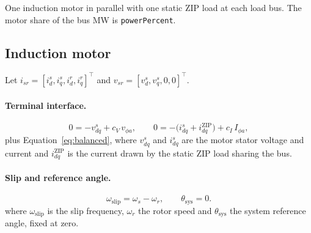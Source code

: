 \documentclass[11pt]{article}
\newcommand{\wsys}{\omega_s}
\newcommand{\wrot}{\omega_r}
\begin{document}
One induction motor in parallel with one static ZIP load at each load bus.
The motor share of the bus MW is \texttt{powerPercent}.

\subsection{Induction motor}

Let $i_{sr} = [i_{d}^{s}, i_{q}^{s}, i_{d}^{r}, i_{q}^{r}]^\top$ and
$v_{sr} = [v_d^s, v_q^s, 0, 0]^\top$.

\paragraph{Terminal interface.}
\begin{equation}
  0 = -v_{dq}^s + c_V\,v_{\phi a},\qquad
  0 = -\big(i_{dq}^s + i_{dq}^{\text{ZIP}}\big) + c_I\,I_{\phi a},
\end{equation}
plus Equation~\eqref{eq:balanced}, where $v_{dq}^s$ and $i_{dq}^s$ are the
motor stator voltage and current and $i_{dq}^{\text{ZIP}}$ is the current
drawn by the static ZIP load sharing the bus.

\paragraph{Slip and reference angle.}
\begin{equation}
  \omega_{\text{slip}} = \wsys - \wrot, \qquad \theta_{\text{sys}} = 0 .
\end{equation}
where $\omega_{\text{slip}}$ is the slip frequency, $\wrot$ the rotor
speed and $\theta_{\text{sys}}$ the system reference angle, fixed at zero.
\end{document}
